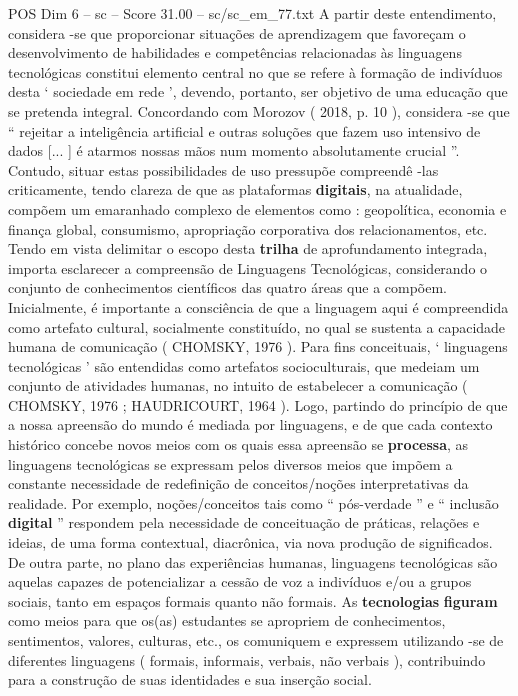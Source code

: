 \begin{textsample}{POS Dim 6 – sc – Score 31.00 – sc/sc\_em\_77.txt}
A partir deste entendimento, considera -se que proporcionar situações de aprendizagem que favoreçam o desenvolvimento de habilidades e competências relacionadas às linguagens tecnológicas constitui elemento central no que se refere à formação de indivíduos desta ‘ sociedade em rede ’, devendo, portanto, ser objetivo de uma educação que se pretenda integral.
Concordando com Morozov ( 2018, p. 10 ), considera -se que “ rejeitar a inteligência artificial e outras soluções que fazem uso intensivo de dados [... ] é atarmos nossas mãos num momento absolutamente crucial ”.
Contudo, situar estas possibilidades de uso pressupõe compreendê -las criticamente, tendo clareza de que as plataformas \textbf{digitais}, na atualidade, compõem um emaranhado complexo de elementos como : geopolítica, economia e finança global, consumismo, apropriação corporativa dos relacionamentos, etc.
Tendo em vista delimitar o escopo desta \textbf{trilha} de aprofundamento integrada, importa esclarecer a compreensão de Linguagens Tecnológicas, considerando o conjunto de conhecimentos científicos das quatro áreas que a compõem.
Inicialmente, é importante a consciência de que a linguagem aqui é compreendida como artefato cultural, socialmente constituído, no qual se sustenta a capacidade humana de comunicação ( CHOMSKY, 1976 ).
Para fins conceituais, ‘ linguagens tecnológicas ’ são entendidas como artefatos socioculturais, que medeiam um conjunto de atividades humanas, no intuito de estabelecer a comunicação ( CHOMSKY, 1976 ; HAUDRICOURT, 1964 ).
Logo, partindo do princípio de que a nossa apreensão do mundo é mediada por linguagens, e de que cada contexto histórico concebe novos meios com os quais essa apreensão se \textbf{processa}, as linguagens tecnológicas se expressam pelos diversos meios que impõem a constante necessidade de redefinição de conceitos/noções interpretativas da realidade.
Por exemplo, noções/conceitos tais como “ pós-verdade ” e “ inclusão \textbf{digital} ” respondem pela necessidade de conceituação de práticas, relações e ideias, de uma forma contextual, diacrônica, via nova produção de significados.
De outra parte, no plano das experiências humanas, linguagens tecnológicas são aquelas capazes de potencializar a cessão de voz a indivíduos e/ou a grupos sociais, tanto em espaços formais quanto não formais.
As \textbf{tecnologias} \textbf{figuram} como meios para que os(as) estudantes se apropriem de conhecimentos, sentimentos, valores, culturas, etc., os comuniquem e expressem utilizando -se de diferentes linguagens ( formais, informais, verbais, não verbais ), contribuindo para a construção de suas identidades e sua inserção social.

\end{textsample}
